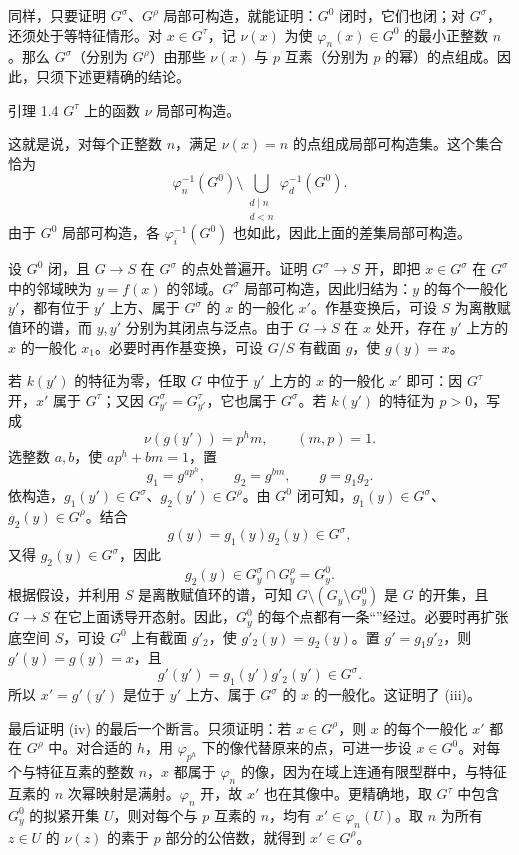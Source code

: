 同样，只要证明 $G^\sigma$、$G^\rho$ 局部可构造，就能证明：$G^0$ 闭时，它们也闭；对 $G^\sigma$，还须处于等特征情形。对 $x\in G^\tau$，记 $\nu(x)$ 为使 $\varphi_n(x)\in G^0$ 的最小正整数 $n$。那么 $G^\sigma$（分别为 $G^\rho$）由那些 $\nu(x)$ 与 $p$ 互素（分别为 $p$ 的幂）的点组成。因此，只须下述更精确的结论。

\begin{statement}{引理 1.4}
$G^\tau$ 上的函数 $\nu$ 局部可构造。
\end{statement}
这就是说，对每个正整数 $n$，满足 $\nu(x)=n$ 的点组成局部可构造集。这个集合恰为
\[
 \varphi_n^{-1}(G^0)\setminus\bigcup_{\substack{d\mid n\\d<n}}\varphi_d^{-1}(G^0).
\]
由于 $G^0$ 局部可构造，各 $\varphi_i^{-1}(G^0)$ 也如此，因此上面的差集局部可构造。

设 $G^0$ 闭，且 $G\to S$ 在 $G^\sigma$ 的点处普遍开。证明 $G^\sigma\to S$ 开，即把 $x\in G^\sigma$ 在 $G^\sigma$ 中的邻域映为 $y=f(x)$ 的邻域。$G^\sigma$ 局部可构造，因此归结为：$y$ 的每个一般化 $y'$，都有位于 $y'$ 上方、属于 $G^\sigma$ 的 $x$ 的一般化 $x'$。作基变换后，可设 $S$ 为离散赋值环的谱，而 $y,y'$ 分别为其闭点与泛点。由于 $G\to S$ 在 $x$ 处开，存在 $y'$ 上方的 $x$ 的一般化 $x_1$。必要时再作基变换，可设 $G/S$ 有截面 $g$，使 $g(y)=x$。

若 $k(y')$ 的特征为零，任取 $G$ 中位于 $y'$ 上方的 $x$ 的一般化 $x'$ 即可：因 $G^\tau$ 开，$x'$ 属于 $G^\tau$；又因 $G_{y'}^\sigma=G_{y'}^\tau$，它也属于 $G^\sigma$。若 $k(y')$ 的特征为 $p>0$，写成
\[
 \nu(g(y'))=p^hm,\qquad (m,p)=1.
\]
选整数 $a,b$，使 $ap^h+bm=1$，置
\[
 g_1=g^{ap^h},\qquad g_2=g^{bm},\qquad g=g_1g_2.
\]
依构造，$g_1(y')\in G^\sigma$、$g_2(y')\in G^\rho$。由 $G^0$ 闭可知，$g_1(y)\in G^\sigma$、$g_2(y)\in G^\rho$。结合
\[
 g(y)=g_1(y)g_2(y)\in G^\sigma,
\]
又得 $g_2(y)\in G^\sigma$，因此
\[
 g_2(y)\in G_y^\sigma\cap G_y^\rho=G_y^0.
\]
根据假设，并利用 $S$ 是离散赋值环的谱，可知 $G\setminus(G_y\setminus G_y^0)$ 是 $G$ 的开集，且 $G\to S$ 在它上面诱导开态射。因此，$G_y^0$ 的每个点都有一条“”经过。必要时再扩张底空间 $S$，可设 $G^0$ 上有截面 $g'_2$，使 $g'_2(y)=g_2(y)$。置 $g'=g_1g'_2$，则 $g'(y)=g(y)=x$，且
\[
 g'(y')=g_1(y')g'_2(y')\in G^\sigma.
\]
所以 $x'=g'(y')$ 是位于 $y'$ 上方、属于 $G^\sigma$ 的 $x$ 的一般化。这证明了 (iii)。

最后证明 (iv) 的最后一个断言。只须证明：若 $x\in G^\rho$，则 $x$ 的每个一般化 $x'$ 都在 $G^\rho$ 中。对合适的 $h$，用 $\varphi_{p^h}$ 下的像代替原来的点，可进一步设 $x\in G^0$。对每个与特征互素的整数 $n$，$x$ 都属于 $\varphi_n$ 的像，因为在域上连通有限型群中，与特征互素的 $n$ 次幂映射是满射。$\varphi_n$ 开，故 $x'$ 也在其像中。更精确地，取 $G^\tau$ 中包含 $G_y^0$ 的拟紧开集 $U$，则对每个与 $p$ 互素的 $n$，均有 $x'\in\varphi_n(U)$。取 $n$ 为所有 $z\in U$ 的 $\nu(z)$ 的素于 $p$ 部分的公倍数，就得到 $x'\in G^\rho$。

